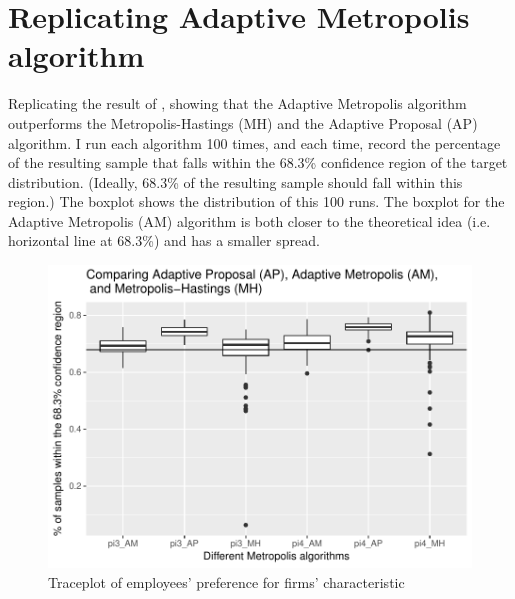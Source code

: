 \documentclass[12pt]{article}
\begin{document}
\section{Replicating Adaptive Metropolis algorithm}

Replicating the result of \citep{Haario1999, Haario2001}, showing that the
Adaptive Metropolis algorithm outperforms the Metropolis-Hastings (MH) and the
Adaptive Proposal (AP) algorithm. I run each algorithm 100 times, and each
time, record the percentage of the resulting sample that falls within the 68.3\%
confidence region of the target distribution. (Ideally, 68.3\% of the resulting
sample should fall within this region.) The boxplot shows the distribution of
this 100 runs. The boxplot for the Adaptive Metropolis (AM) algorithm is both
closer to the theoretical idea (i.e. horizontal line at 68.3\%) and has a
smaller spread. 


\begin{figure}[!ht]
\centering
\includegraphics[width=\textwidth]{../figure/comparing_AP_AM_MH}
\caption{Traceplot of employees' preference for firms' characteristic}
\end{figure}

\clearpage


\end{document}
